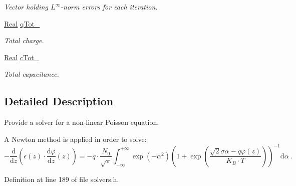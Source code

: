 \begin{DoxyCompactItemize}
\begin{DoxyCompactList}\small\item\em Vector holding $ L^\infty $-\/norm errors for each iteration. \end{DoxyCompactList}\item 
\hypertarget{classNonLinearPoisson1D_a5fa713b8efdf7b2651478e560ae70074}{\hyperlink{typedefs_8h_a060b837c3b4486ee35317744156f3da2}{Real} \hyperlink{classNonLinearPoisson1D_a5fa713b8efdf7b2651478e560ae70074}{q\-Tot\-\_\-}}\label{classNonLinearPoisson1D_a5fa713b8efdf7b2651478e560ae70074}

\begin{DoxyCompactList}\small\item\em Total charge. \end{DoxyCompactList}\item 
\hypertarget{classNonLinearPoisson1D_a4edec5e6395e5a862df829a223323533}{\hyperlink{typedefs_8h_a060b837c3b4486ee35317744156f3da2}{Real} \hyperlink{classNonLinearPoisson1D_a4edec5e6395e5a862df829a223323533}{c\-Tot\-\_\-}}\label{classNonLinearPoisson1D_a4edec5e6395e5a862df829a223323533}

\begin{DoxyCompactList}\small\item\em Total capacitance. \end{DoxyCompactList}\end{DoxyCompactItemize}


\subsection{Detailed Description}
Provide a solver for a non-\/linear Poisson equation. 

A Newton method is applied in order to solve\-: \[ -\frac{\mathrm{d}}{\mathrm{d}z} \left(\epsilon(z) \cdot \frac{\mathrm{d}\varphi}{\mathrm{d}z}(z) \right) = - q \cdot \frac{N_0}{\sqrt{\pi}} \int_{-\infty}^{+\infty} \exp\left(-\alpha^2\right) \left( 1 + \exp\left( \frac{\sqrt{2}\sigma\alpha - q\varphi(z)}{K_B \cdot T} \right) \right)^{-1} \mathrm{d}\alpha ~ . \] 

Definition at line 189 of file solvers.\-h.



